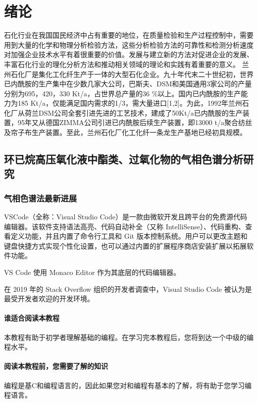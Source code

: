 \chapter{绪论}

石化行业在我国国民经济中占有重要的地位，在质量检验和生产过程控制中，需要用到大量的化学和物理分析检验方法，这些分析检验方法的可靠性和检测分析速度对加强企业技术水平有着很重要的价值。发展与建立新的方法对促进企业的发展、丰富石化行业的理化分析方法和推动相关领域的理论和实践有着重要的意义。
兰州石化厂是集化工化纤生产于一体的大型石化企业。九十年代末二十世纪初，世界已内酰胺的生产集中在少数几家大公司，巴斯夫、DSM和美国通用3家公司的产量分别为695，420，330 Kt/a，占世界总产量的36 \%以上。国内已内酰胺的生产能力为185 Kt/a，仅能满足国内需求的1/3，需大量进口[1,2]。为此，1992年兰州石化厂从荷兰DSM公司全套引进先进的工艺技术，建成了50Kt/a已内酰胺的生产装置，95年又从德国ZIMMA公司引进已内酰胺后续生产装置，即13000 t/a聚合纺丝及帘子布生产装置。至此，兰州石化厂化工化纤一条龙生产基地已经初具规模。

\section{环已烷高压氧化液中酯类、过氧化物的气相色谱分析研究}
\subsection{气相色谱法最新进展}

VSCode（全称：Visual Studio Code）是一款由微软开发且跨平台的免费源代码编辑器。该软件支持语法高亮、代码自动补全（又称 IntelliSense）、代码重构、查看定义功能，并且内置了命令行工具和 Git 版本控制系统。用户可以更改主题和键盘快捷方式实现个性化设置，也可以通过内置的扩展程序商店安装扩展以拓展软件功能。

VS Code 使用 Monaco Editor 作为其底层的代码编辑器。

在 2019 年的 Stack Overflow 组织的开发者调查中，Visual Studio Code 被认为是最受开发者欢迎的开发环境。

\subsubsection{谁适合阅读本教程}

本教程有助于初学者理解基础的编程。在学习完本教程后，您将到达一个中级的编程水平。

\subsubsection{阅读本教程前，您需要了解的知识}

编程是基C和编程语言的，因此如果您对和编程有基本的了解，将有助于您学习编程语言。


